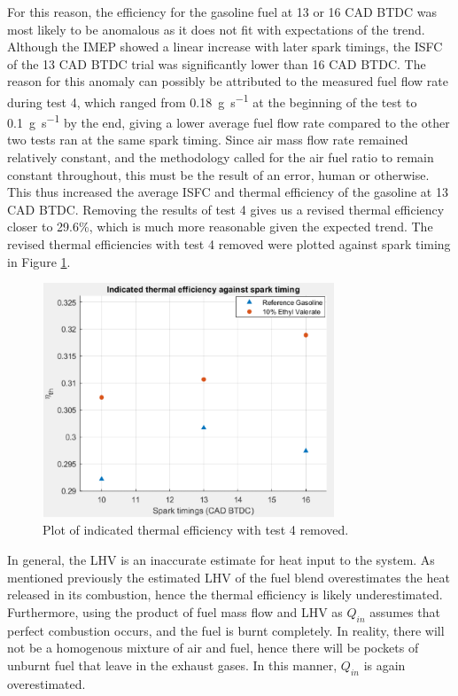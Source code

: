 \documentclass[11pt]{article}
\begin{document}
For this reason, the efficiency for the gasoline fuel at 13 or 16 CAD BTDC was most likely to be anomalous as it does not fit with expectations of the trend. Although the IMEP showed a linear increase with later spark timings, the ISFC of the 13 CAD BTDC trial was significantly lower than 16 CAD BTDC. The reason for this anomaly can possibly be attributed to the measured fuel flow rate during test 4, which ranged from \SI{0.18}{\gram\per\second} at the beginning of the test to \SI{0.1}{\gram\per\second} by the end, giving a lower average fuel flow rate compared to the other two tests ran at the same spark timing. Since air mass flow rate remained relatively constant, and the methodology called for the air fuel ratio to remain constant throughout, this must be the result of an error, human or otherwise. This thus increased the average ISFC and thermal efficiency of the gasoline at 13 CAD BTDC. Removing the results of test 4 gives us a revised thermal efficiency closer to 29.6\%, which is much more reasonable given the expected trend. The revised thermal efficiencies with test 4 removed were plotted against spark timing in Figure \ref{q3-f2}. 
\begin{figure}[H]
    \centering
    \includegraphics[height = 7cm]{./img/diagram1.png}
    \caption{Plot of indicated thermal efficiency with test 4 removed.}
    \label{q3-f2}
\end{figure}
In general, the LHV is an inaccurate estimate for heat input to the system. As mentioned previously the estimated LHV of the fuel blend overestimates the heat released in its combustion, hence the thermal efficiency is likely underestimated. Furthermore, using the product of fuel mass flow and LHV as $Q_{in}$ assumes that perfect combustion occurs, and the fuel is burnt completely. In reality, there will not be a homogenous mixture of air and fuel, hence there will be pockets of unburnt fuel that leave in the exhaust gases. In this manner, $Q_{in}$ is again overestimated.  
\end{document}
